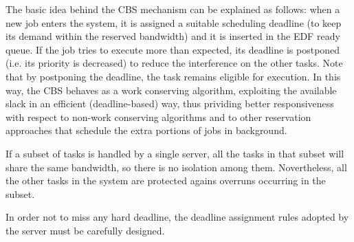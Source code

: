 The basic idea behind the CBS mechanism can be explained as follows: when a new job enters the system, it is assigned a suitable scheduling deadline (to keep its demand within the reserved bandwidth) and it is inserted in the EDF ready queue. If the job tries to execute more than expected, its deadline is postponed (i.e. its priority is decreased) to reduce the interference on the other tasks. Note that by postponing the deadline, the task remains eligible for execution. In this way, the CBS behaves as a work conserving algorithm, exploiting the available slack in an efficient (deadline-based) way, thus prividing better responsiveness with respect to non-work conserving algorithms and to other reservation approaches that schedule the extra portions of jobs in background.

If a subset of tasks is handled by a single server, all the tasks in that subset will share the same bandwidth, so there is no isolation among them. Novertheless, all the other tasks in the system are protected agains overruns occurring in the subset.

In order not to miss any hard deadline, the deadline assignment rules adopted by the server must be carefully designed.


